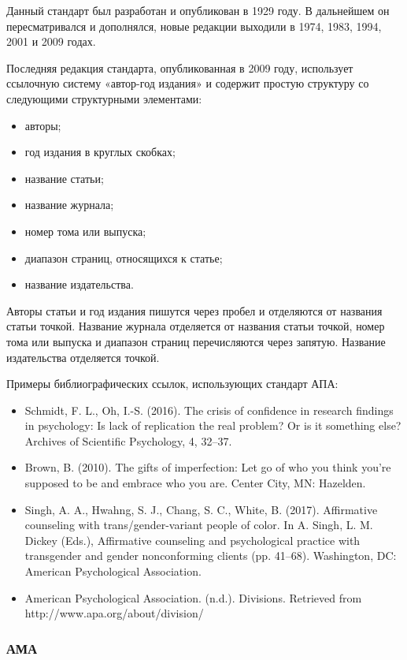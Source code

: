 Данный стандарт был разработан и опубликован в 1929 году. В дальнейшем он пересматривался и дополнялся, новые редакции выходили в 1974, 1983, 1994, 2001 и 2009 годах.

Последняя редакция стандарта, опубликованная в 2009 году, использует ссылочную систему «автор-год издания» и содержит простую структуру со следующими структурными элементами:
\begin{itemize}
	\item авторы;
	\item год издания в круглых скобках;
	\item название статьи;
	\item название журнала;
	\item номер тома или выпуска;
	\item диапазон страниц, относящихся к статье;
	\item название издательства.
\end{itemize}

Авторы статьи и год издания пишутся через пробел и отделяются от названия статьи точкой. Название журнала отделяется от названия статьи точкой, номер тома или выпуска и диапазон страниц перечисляются через запятую. Название издательства отделяется точкой.

Примеры библиографических ссылок, использующих стандарт АПА:
\begin{itemize}
	\item Schmidt, F. L., Oh, I.-S. (2016). The crisis of confidence in research findings in psychology: Is lack of replication the real problem? Or is it something else? Archives of Scientific Psychology, 4, 32–37.
	\item Brown, B. (2010). The gifts of imperfection: Let go of who you think you're supposed to be and embrace who you are. Center City, MN: Hazelden.
	\item Singh, A. A., Hwahng, S. J., Chang, S. C., White, B. (2017). Affirmative counseling with trans/gender-variant people of color. In A. Singh, L. M. Dickey (Eds.), Affirmative counseling and psychological practice with transgender and gender nonconforming clients (pp. 41–68). Washington, DC: American Psychological Association.
	\item American Psychological Association. (n.d.). Divisions. Retrieved from http://www.apa.org/about/division/
\end{itemize}

\subsubsection*{АМА}

